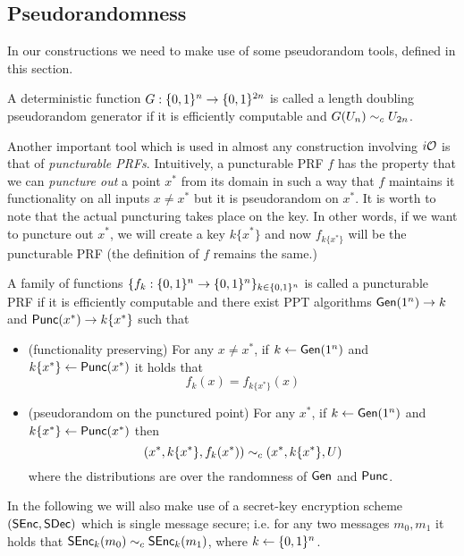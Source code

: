 \subsection{Pseudorandomness}

In our constructions we need to make use of some pseudorandom tools, defined in this section. 

\begin{mydef}[PRG]
A deterministic function $G:\{0,1\}^n\to\{0,1\}^{2n}$ is called a length doubling pseudorandom generator if it is efficiently computable and $G(U_n)\sim_c U_{2n}$.
\end{mydef}

Another important tool which is used in almost any construction involving $i\mathcal{O}$ is that of \emph{puncturable PRFs}. Intuitively, a puncturable PRF $f$ has the property that we can \emph{puncture out} a point $x^*$ from its domain in such a way that $f$ maintains it functionality on all inputs $x\ne x^*$ but it is pseudorandom on $x^*$. It is worth to note that the actual puncturing takes place on the key. In other words, if we want to puncture out $x^*$, we will create a key $k\{x^*\}$ and now $f_{k\{x^*\}}$ will be the puncturable PRF (the definition of $f$ remains the same.)

\begin{mydef}
A family of functions $\{f_k:\{0,1\}^n\to\{0,1\}^n\}_{k\in\{0,1\}^n}$ is called a puncturable PRF if it is efficiently computable and there exist PPT algorithms $\mathsf{Gen}(1^n)\to k$ and $\mathsf{Punc}(x^*)\to k\{x^*\}$ such that
\begin{itemize}
\item (functionality preserving) For any $x\ne x^*$, if $k\gets\mathsf{Gen}(1^n)$ and $k\{x^*\}\gets\mathsf{Punc}(x^*)$ it holds that
\[
f_k(x)=f_{k\{x^*\}}(x)
\]
\item (pseudorandom on the punctured point) For any $x^*$, if $k\gets\mathsf{Gen}(1^n)$ and $k\{x^*\}\gets\mathsf{Punc}(x^*)$ then
\[
\left(x^*,k\{x^*\},f_k(x^*)\right)\sim_c \left(x^*,k\{x^*\},U\right)
\]
where the distributions are over the randomness of $\mathsf{Gen}$ and $\mathsf{Punc}$.
\end{itemize}
\end{mydef}

In the following we will also make use of a secret-key encryption scheme $(\mathsf{SEnc},\mathsf{SDec})$ which is single message secure; i.e. for any two messages $m_0,m_1$ it holds that $\mathsf{SEnc}_k(m_0)\sim_c\mathsf{SEnc}_k(m_1)$, where $k\gets\{0,1\}^n$.


